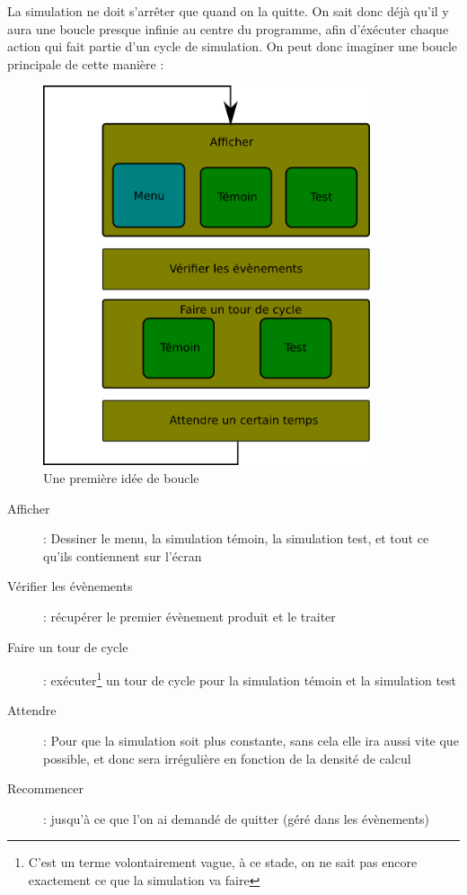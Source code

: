 La simulation ne doit s’arrêter que quand on la quitte. On sait donc déjà qu’il y aura une boucle
presque infinie au centre du programme, afin d’éxécuter chaque action qui fait partie d’un cycle de
simulation. On peut donc imaginer une boucle principale de cette manière : 
\begin{figure}[H]
	\centering
	\includegraphics[width=26em]{Images/boucle_naive.png}
	\caption{Une première idée de boucle}
\end{figure}

\begin{description}
	\item[Afficher] : Dessiner le menu, la simulation témoin, la simulation test, et tout ce qu'ils contiennent sur l'écran
	\item[Vérifier les évènements] : récupérer le premier évènement produit et le traiter
	\item[Faire un tour de cycle] : exécuter\footnote{C'est un terme volontairement vague, à ce stade, on ne sait pas encore exactement ce que la simulation va faire} un tour de cycle pour la simulation témoin et la simulation test
	\item[Attendre] : Pour que la simulation soit plus constante, sans cela elle ira aussi vite que possible, et donc sera irrégulière en fonction de la densité de calcul
	\item[Recommencer] : jusqu'à ce que l'on ai demandé de quitter (géré dans les évènements)
\end{description}

